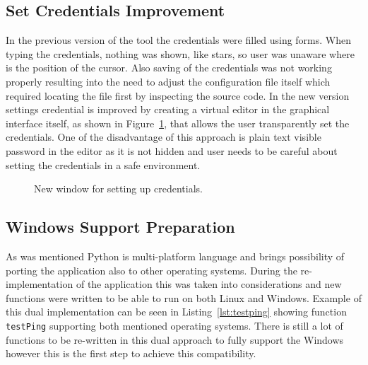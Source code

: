 \subsection{Set Credentials Improvement}
In the previous version of the tool the credentials were filled using forms. When typing the credentials, nothing was shown, like stars, so user was unaware where is the position of the cursor. Also saving of the credentials was not working properly resulting into the need to adjust the configuration file itself which required locating the file first by inspecting the source code. In the new version settings credential is improved by creating a virtual editor in the graphical interface itself, as shown in Figure~\ref{fig:credentials}, that allows the user transparently set the credentials. One of the disadvantage of this approach is plain text visible password in the editor as it is not hidden and user needs to be careful about setting the credentials in a safe environment.

\begin{figure}[H]
	\centering
	\caption{New window for setting up credentials.}
	\label{fig:credentials}
\end{figure}

\subsection{Windows Support Preparation}
As was mentioned Python is multi-platform language and brings possibility of porting the application also to other operating systems. During the re-implementation of the application this was taken into considerations and new functions were written to be able to run on both Linux and Windows. Example of this dual implementation can be seen in Listing~\ref{lst:testping} showing function \texttt{testPing} supporting both mentioned operating systems. There is still a lot of functions to be re-written in this dual approach to fully support the Windows however this is the first step to achieve this compatibility.

